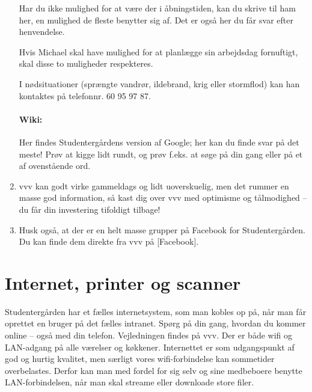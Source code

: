 \documentclass[11pt,article,twoside,openany,danish,extrafontsizes]{memoir} %
\begin{document}
\begin{enumerate}
Har du ikke mulighed for at være der i åbningstiden, kan du skrive til ham her, en mulighed de fleste benytter sig af. Det er også her du får svar efter henvendelse.

Hvis Michael skal have mulighed for at planlægge sin arbejdsdag fornuftigt, skal disse to muligheder respekteres.


I nødsituationer (sprængte vandrør, ildebrand, krig eller stormflod) kan han kontaktes på telefonnr. 60 95 97 87.



		\paragraph{Wiki:} Her findes Studentergårdens version af Google; her kan du finde svar på det meste! Prøv at kigge lidt rundt, og prøv f.eks. at søge på din gang eller på et af ovenstående ord.




	\item vvv kan godt virke gammeldags og lidt uoverskuelig, men det rummer en masse god information, så kast dig over vvv med optimisme og tålmodighed -- du får din investering tifoldigt tilbage!

	\item Husk også, at der er en helt masse grupper på Facebook for Studentergården. Du kan finde dem direkte fra vvv på [Facebook].
\end{enumerate}

\section{Internet, printer og scanner}
Studentergården har et fælles internetsystem, som man kobles op på, når man får oprettet en bruger på det fælles intranet. Spørg på din gang, hvordan du kommer online -- også med din telefon. Vejledningen findes på vvv. Der er både wifi og LAN-adgang på alle værelser og køkkener. Internettet er som udgangspunkt af god og hurtig kvalitet, men særligt vores wifi-forbindelse kan sommetider overbelastes. Derfor kan man med fordel for sig selv og sine medbeboere benytte LAN-forbindelsen, når man skal streame eller downloade store filer.
\end{document}
